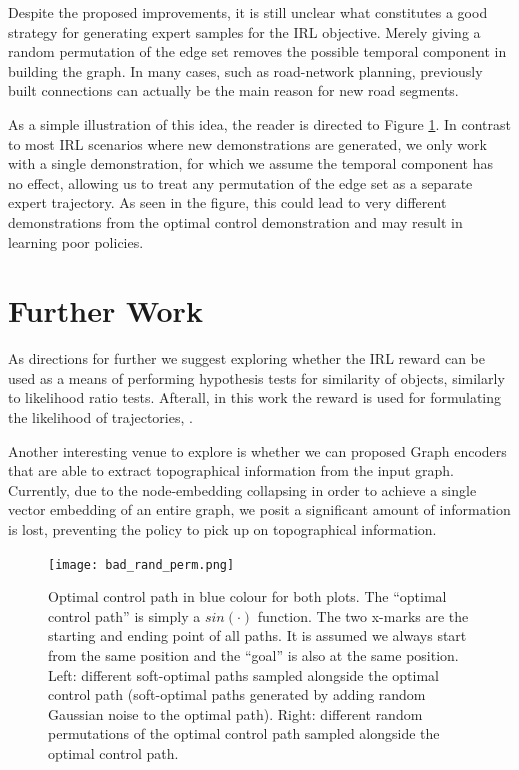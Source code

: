 \documentclass{report}
\numberwithin{equation}{section}
\numberwithin{figure}{section}
\numberwithin{table}{section}
\numberwithin{algorithm}{section}
\begin{document}
Despite the proposed improvements, it is still unclear what constitutes 
a good strategy for generating expert samples for the IRL objective. 
Merely giving a random permutation of the edge set removes 
the possible 
temporal component in building the graph. In many cases, such as 
road-network planning, previously built connections can actually 
be the main reason for new road segments. 

As a simple illustration 
of this idea, the reader is directed to 
Figure \ref{fig:bad_rand_perm}.
In contrast to most IRL scenarios where new demonstrations 
are generated, 
we only work with a single demonstration, for which we assume 
the temporal 
component has no effect, allowing us to treat any permutation of the 
edge set as a separate expert trajectory. As seen in the figure, this 
could lead to very different demonstrations from the optimal control 
demonstration and may result in learning poor policies.

\section{Further Work}
As directions for further we suggest 
exploring whether the IRL reward can be used as a means of performing 
hypothesis tests for similarity of objects, similarly to 
likelihood ratio tests. Afterall, in this work the 
reward is used for formulating the likelihood of trajectories, 
\citep{Ziebart2008}.

Another interesting venue to explore is whether 
we can proposed Graph encoders that are able to extract 
topographical information from the input graph. Currently, 
due to the node-embedding collapsing in order to achieve 
a single vector embedding of an entire graph, we posit 
a significant amount of information is lost, preventing the 
policy to pick up on topographical information.


\begin{figure}[H]
  \centering
  \texttt{[image: bad\_rand\_perm.png]}
  \caption{\label{fig:bad_rand_perm} Optimal control path 
  in blue colour for both plots. The ``optimal control path'' 
  is simply a $sin(\cdot)$ function. The two x-marks are the 
  starting and ending point of all paths. It is assumed 
  we always start from the same position and the ``goal'' is also 
  at the same position. Left: different soft-optimal 
  paths sampled alongside the optimal control path (soft-optimal 
  paths generated by adding random Gaussian noise to the optimal 
  path). Right: different 
  random permutations of the optimal control path sampled alongside 
  the optimal control path.}
\end{figure}
\end{document}
